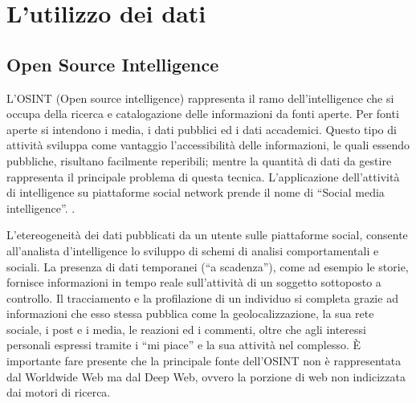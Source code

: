\section{L'utilizzo dei dati}
\subsection{Open Source Intelligence} \label{OSINT}
L'OSINT \cite{intelligence_guida} (Open source intelligence) rappresenta il ramo dell'intelligence che si occupa della ricerca e catalogazione delle informazioni da fonti aperte. Per fonti aperte si intendono i media, i dati pubblici ed i dati accademici. Questo tipo di attivit\`a sviluppa come vantaggio l'accessibilit\`a delle informazioni, le quali essendo pubbliche, risultano facilmente reperibili; mentre la quantit\`a di dati da gestire rappresenta il principale problema di questa tecnica.
L'applicazione dell'attivit\`a di intelligence su piattaforme social network prende il nome di ``Social media intelligence''.
\cite{gnosis_int}.

L'etereogeneit\`a dei dati pubblicati da un utente sulle piattaforme social, consente all'analista d'intelligence lo sviluppo di schemi di analisi comportamentali e sociali. La presenza di dati temporanei (``a scadenza''), come ad esempio le storie, fornisce informazioni in tempo reale sull'attivit\`a di un soggetto sottoposto a controllo.
Il tracciamento e la profilazione di un individuo si completa grazie ad informazioni che esso stessa pubblica come la geolocalizzazione, la sua rete sociale, i post e i media, le reazioni ed i commenti, oltre che agli interessi personali espressi tramite i ``mi piace'' e la sua attivit\`a nel complesso.
\`E importante fare presente che la principale fonte dell'OSINT non \`e rappresentata dal Worldwide Web ma dal Deep Web, ovvero la porzione di web non indicizzata dai motori di ricerca.
